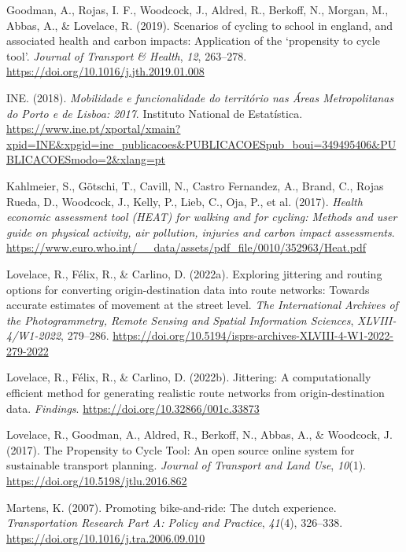 \documentclass[review, doubleblind, 3p,
authoryear]{elsarticle} %
\newlength{\cslhangindent}
\newlength{\cslentryspacingunit} %
\newenvironment{CSLReferences}[2] %
 {%
  \setlength{\parindent}{0pt}
  \ifodd #1
  \let\oldpar\par
  \def\par{\hangindent=\cslhangindent\oldpar}
  \fi
  \setlength{\parskip}{#2\cslentryspacingunit}
 }%
 {}
\begin{document}
\begin{CSLReferences}{1}{0}
\leavevmode{}%
Goodman, A., Rojas, I. F., Woodcock, J., Aldred, R., Berkoff, N.,
Morgan, M., Abbas, A., \& Lovelace, R. (2019). Scenarios of cycling to
school in england, and associated health and carbon impacts: Application
of the {`}propensity to cycle tool{'}. \emph{Journal of Transport \&
Health}, \emph{12}, 263--278.
\url{https://doi.org/10.1016/j.jth.2019.01.008}

\leavevmode{}%
INE. (2018). \emph{Mobilidade e funcionalidade do território nas {Áreas
Metropolitanas do Porto e de Lisboa}: 2017}. {Instituto National de
Estatística}.
\url{https://www.ine.pt/xportal/xmain?xpid=INE\&xpgid=ine_publicacoes\&PUBLICACOESpub_boui=349495406\&PUBLICACOESmodo=2\&xlang=pt}

\leavevmode{}%
Kahlmeier, S., Götschi, T., Cavill, N., Castro Fernandez, A., Brand, C.,
Rojas Rueda, D., Woodcock, J., Kelly, P., Lieb, C., Oja, P., et al.
(2017). \emph{Health economic assessment tool ({HEAT}) for walking and
for cycling: Methods and user guide on physical activity, air pollution,
injuries and carbon impact assessments}.
\url{https://www.euro.who.int/__data/assets/pdf_file/0010/352963/Heat.pdf}

\leavevmode{}%
Lovelace, R., Félix, R., \& Carlino, D. (2022a). Exploring jittering and
routing options for converting origin-destination data into route
networks: Towards accurate estimates of movement at the street level.
\emph{The International Archives of the Photogrammetry, Remote Sensing
and Spatial Information Sciences}, \emph{XLVIII-4/W1-2022}, 279--286.
\url{https://doi.org/10.5194/isprs-archives-XLVIII-4-W1-2022-279-2022}

\leavevmode{}%
Lovelace, R., Félix, R., \& Carlino, D. (2022b). Jittering: A
computationally efficient method for generating realistic route networks
from origin-destination data. \emph{Findings}.
\url{https://doi.org/10.32866/001c.33873}

\leavevmode{}%
Lovelace, R., Goodman, A., Aldred, R., Berkoff, N., Abbas, A., \&
Woodcock, J. (2017). The Propensity to Cycle Tool: An open source online
system for sustainable transport planning. \emph{Journal of Transport
and Land Use}, \emph{10}(1). \url{https://doi.org/10.5198/jtlu.2016.862}

\leavevmode{}%
Martens, K. (2007). Promoting bike-and-ride: The dutch experience.
\emph{Transportation Research Part A: Policy and Practice},
\emph{41}(4), 326--338. \url{https://doi.org/10.1016/j.tra.2006.09.010}


\end{CSLReferences}
\end{document}
